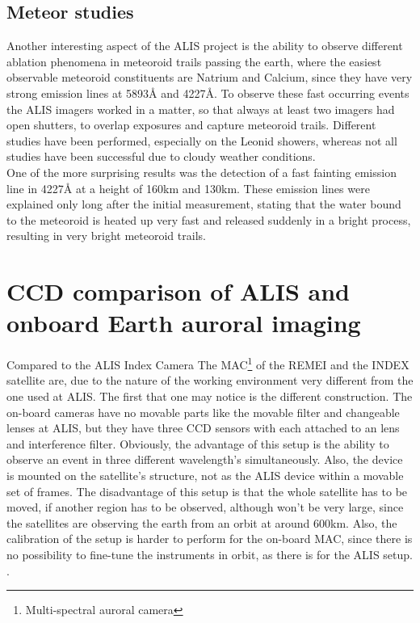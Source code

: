 \subsection{Meteor studies}
Another interesting aspect of the ALIS project is the ability to observe different ablation phenomena in meteoroid trails passing the earth, where the easiest observable meteoroid constituents are Natrium and Calcium, since they have very strong emission lines at 5893Å and 4227Å. To observe these fast occurring events the ALIS imagers worked in a matter, so that always at least two imagers had open shutters, to overlap exposures and capture meteoroid trails.
Different studies have been performed, especially on the Leonid showers, whereas not all studies have been successful due to cloudy weather conditions.\\
One of the more surprising results was the detection of a fast fainting emission line in 4227Å at a height of 160km and 130km. These emission lines were explained only long after the initial measurement, stating that the water bound to the meteoroid is heated up very fast and released suddenly in a bright process, resulting in very bright meteoroid trails.

\section{CCD comparison of ALIS and onboard Earth auroral imaging}
Compared to the ALIS Index Camera
The MAC\footnote{Multi-spectral auroral camera} of the REMEI and the INDEX satellite are, due to the nature of the working environment very different from the one used at ALIS.
The first that one may notice is the different construction. The on-board cameras have no movable parts like the movable filter and changeable lenses at ALIS, but they have three CCD sensors with each attached to an lens and interference filter. Obviously, the advantage of this setup is the ability to observe an event in three different wavelength's simultaneously. Also, the device is mounted on the satellite's structure, not as the ALIS device within a movable set of frames. The disadvantage of this setup is that the whole satellite has to be moved, if another region has to be observed, although won't be very large, since the satellites are observing the earth from an orbit at around 600km. Also, the calibration of the setup is harder to perform for the on-board MAC, since there is no possibility to fine-tune the instruments in orbit, as there is for the ALIS setup. \citep{sakanoi2003development,obuchi2008initial,brandstrom2003auroral}.

